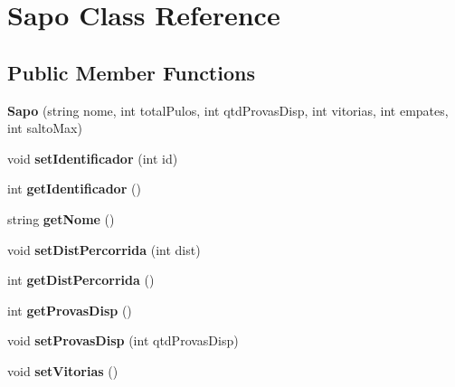 \hypertarget{classSapo}{}\section{Sapo Class Reference}
\label{classSapo}
\subsection*{Public Member Functions}
\begin{DoxyCompactItemize}
\item 
\mbox{\label{classSapo_a070afc7659ec186dfde1d21767303d63}} 
{\bfseries Sapo} (string nome, int total\+Pulos, int qtd\+Provas\+Disp, int vitorias, int empates, int salto\+Max)
\item 
\mbox{\label{classSapo_a35ce13e0007abcb68f34cd9b62f768bc}} 
void {\bfseries set\+Identificador} (int id)
\item 
\mbox{\label{classSapo_ac0e085ee2442a9c68fabed010351c4e9}} 
int {\bfseries get\+Identificador} ()
\item 
\mbox{\label{classSapo_acfb11cd24152f00c9a4996f26f3ee39b}} 
string {\bfseries get\+Nome} ()
\item 
\mbox{\label{classSapo_ae6bf008a77553fc705a684e9f1a2ab10}} 
void {\bfseries set\+Dist\+Percorrida} (int dist)
\item 
\mbox{\label{classSapo_a22b68adf7cea529b75d797d43d9d2511}} 
int {\bfseries get\+Dist\+Percorrida} ()
\item 
\mbox{\label{classSapo_a45f8facecbd8dd5329e93cea1435406f}} 
int {\bfseries get\+Provas\+Disp} ()
\item 
\mbox{\label{classSapo_ac0c9750e7fac7f16f94a43c4783647d2}} 
void {\bfseries set\+Provas\+Disp} (int qtd\+Provas\+Disp)
\item 
\mbox{\label{classSapo_aff0d9d3e4811415933ee69354e71b8f3}} 
void {\bfseries set\+Vitorias} ()
\item 
\mbox{\label{classSapo_a102f82c22691765c15873d4ea667156e}} 

\end{DoxyCompactItemize}
